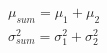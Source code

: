 \documentclass[preview]{standalone}
\begin{document}
\begin{align*}
\mu_{sum} = \mu_1 + \mu_2 \\ \sigma_{sum}^2 = \sigma_1^2 + \sigma_2^2
\end{align*}
\end{document}
